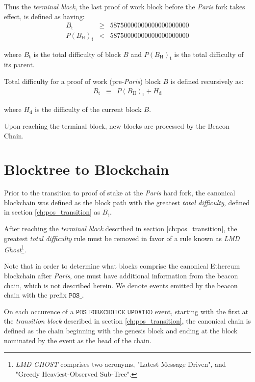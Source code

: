 \documentclass[9pt,oneside]{amsart}
\begin{document}
\begin{multicols}{2}
Thus the \textit{terminal block}, the last proof of work block before the \textit{Paris} fork takes effect, is defined as having:
\begin{eqnarray}
  B_{\mathrm{t}} & \geqslant & 58750000000000000000000 \\
  P(B_{\mathrm{H}})_{\mathrm{t}} & < & 58750000000000000000000
\end{eqnarray}

where $B_{\mathrm{t}}$ is the total difficulty of block $B$ and $P(B_{\mathrm{H}})_{\mathrm{t}}$ is the total difficulty of its parent.

Total difficulty for a proof of work (pre-\textit{Paris}) block $B$ is defined recursively as:
\begin{eqnarray}
B_{\mathrm{t}} & \equiv & P(B_{\mathrm{H}})_{\mathrm{t}} + H_{\mathrm{d}}
\end{eqnarray}

where $H_{\mathrm{d}}$ is the difficulty of the current block $B$.

Upon reaching the terminal block, new blocks are processed by the Beacon Chain.

\section{Blocktree to Blockchain} \label{ch:blocktree_to_blockchain}

Prior to the transition to proof of stake at the \textit{Paris} hard fork, the canonical blockchain was defined as the block path with the greatest \textit{total difficulty}, defined in section \ref{ch:pos_transition} as $B_{\mathrm{t}}$.

After reaching the \textit{terminal block} described in section \ref{ch:pos_transition}, the greatest \textit{total difficulty} rule must be removed in favor of a rule known as \textit{LMD Ghost}\footnote{\textit{LMD GHOST} comprises two acronyms, "Latest Message Driven", and "Greedy Heaviest-Observed Sub-Tree".}.

Note that in order to determine what blocks comprise the canonical Ethereum blockchain after \textit{Paris}, one must have additional information from the beacon chain, which is not described herein. We denote events emitted by the beacon chain with the prefix $\mathtt{POS\_}$.

On each occurence of a $\mathtt{POS\_FORKCHOICE\_UPDATED}$ event, starting with the first at the \textit{transition block} described in section \ref{ch:pos_transition}, the canonical chain is defined as the chain beginning with the genesis block and ending at the block nominated by the event as the head of the chain.


\end{multicols}
\end{document}

